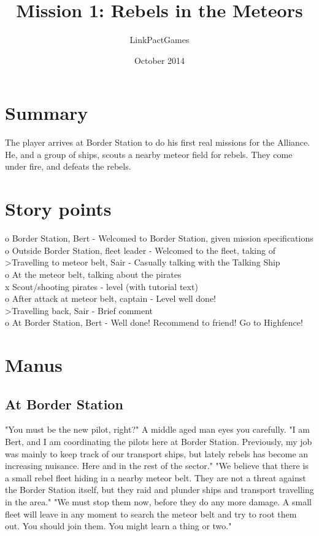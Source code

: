 \documentclass[a4paper,12pt]{article}
\begin{document}
\title{Mission 1: Rebels in the Meteors}
\author{LinkPactGames}
\date{October 2014}
\maketitle

\section{Summary}
The player arrives at Border Station to do his first real missions
for the Alliance. He, and a group of ships, scouts a nearby meteor field
for rebels. They come under fire, and defeats the rebels.

\section{Story points}

o Border Station, Bert - Welcomed to Border Station, given mission specifications\\
o Outside Border Station, fleet leader - Welcomed to the fleet, taking of\\
\textgreater Travelling to meteor belt, Sair - Casually talking with the Talking Ship\\
o At the meteor belt, talking about the pirates\\
x Scout/shooting pirates - level (with tutorial text)\\
o After attack at meteor belt, captain - Level well done!\\
\textgreater Travelling back, Sair - Brief comment\\
o At Border Station, Bert - Well done! Recommend to friend! Go to Highfence!

\section{Manus}

\subsection{At Border Station}

"You must be the new pilot, right?" A middle aged man eyes you carefully.
"I am Bert, and I am coordinating the pilots here at Border Station.
Previously, my job was mainly to keep track of our transport ships, but lately
rebels has become an increasing nuisance. Here and in the rest of the sector."
"We believe that there is a small rebel fleet hiding in a nearby meteor belt.
They are not a threat against the Border Station itself, but they raid and plunder ships
and transport travelling in the area."
"We must stop them now, before they do any more damage. A small fleet will leave in any
moment to search the meteor belt and try to root them out. You should join them.
You might learn a thing or two."
\end{document}
